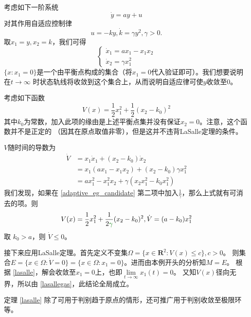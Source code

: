 \begin{example}[利用LaSalle定理判别自适应控制的收敛性]
	考虑如下一阶系统
  \[ \dot{y} = a  y + u \]
  对其作用自适应控制律
  \[ u = - k  y, \dot{k} = \gamma y^2, \gamma > 0. \]
  取$x_1 = y, x_2 = k$，我们可得
  \[ \left\{\begin{array}{l}
       \dot{x}_1 = a  x_1 - x_1 x_2\\
       \dot{x}_2 = \gamma x^2_1
     \end{array}\right. \]
  $\{x:x_1 = 0\}$是一个由平衡点构成的集合（将$x_1=0$代入验证即可）。我们想要说明在$t \rightarrow \infty$
  时状态轨线将收敛到这个集合上，从而说明自适应律可使$y$收敛至$0$。
  
  考虑如下函数
  \begin{equation}\label{adaptive_eg_candidate}
	V (x) = \frac{1}{2} x^2_1 + \frac{1}{2} (x_2 - k_0)^2
  \end{equation}
  其中$k_0$为常数，加入此项的缘由是上述平衡点集并没有保证$x_2=0$。注意，这个函数并不是正定的
  （因其在原点取值非零），但是这并不违背LaSalle定理的条件。
  
  $V$随时间的导数为
  \begin{align*}
    \dot{V} & =  x_1 \dot{x}_1 +  (x_2 - k_0) \dot{x}_2\\
    & =  x_1 (a  x_1 - x_1 x_2) + (x_2 - k_0) \gamma x^2_1\\
	&= ax_1^2-x_1^2x_2+\gamma(x_2x_1^2-k_0x_1^2)
  \end{align*}
  我们发现，如果在 \eqref{adaptive_eg_candidate} 第二项中加入$\frac{1}{\gamma}$，那么上式就有可消去的项。则
  \[V (x) = \frac{1}{2} x^2_1 + \frac{1}{2\textcolor{structurecolor}{\gamma}} (x_2 - k_0)^2, \dot{V}  =  (a - k_0)  x^2_1\]
  取 $k_0 > a$，则 $\dot{V} \leq 0$。

  接下来应用LaSalle定理。首先定义不变集$\Omega = \{ x \in \mathbf{R}^2 : V (x) \leq c \},c>0$。
  则集合$E =\{ x \in \Omega :\dot{V}= 0 \}= \{ x \in \Omega : x_1 = 0 \}$。进而由本例开头的分析知$M = E$。
  根据 \ref{lasalle}，解会收敛至$x_1=0$上，也即$\lim\limits_{t \rightarrow \infty} x_1 (t) = 0$。
  又知$V(x)$径向无界，所以由 \ref{lasallegas}，此结论全局成立。
\end{example}
定理 \ref{lasalle} 除了可用于判别趋于原点的情形，还可推广用于判别收敛至极限环等。
